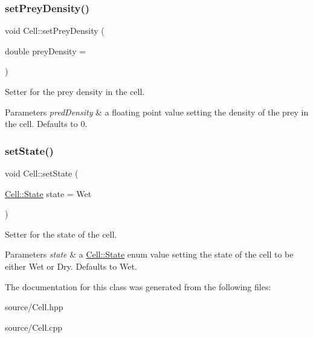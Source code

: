 \subsubsection{\texorpdfstring{set\+Prey\+Density()}{setPreyDensity()}}
{\footnotesize\ttfamily void Cell\+::set\+Prey\+Density (\begin{DoxyParamCaption}\item[{double}]{prey\+Density = {} }\end{DoxyParamCaption})}



Setter for the prey density in the cell. 


\begin{DoxyParams}{Parameters}
{\em pred\+Density} & a floating point value setting the density of the prey in the cell. Defaults to 0. \\
\hline
\end{DoxyParams}
\mbox{\label{class_cell_ac388ff95a4d94da1497847ead859f258}} 
\subsubsection{\texorpdfstring{set\+State()}{setState()}}
{\footnotesize\ttfamily void Cell\+::set\+State (\begin{DoxyParamCaption}\item[{\hyperlink{class_cell_a21d74a2efcb79c93e5649b06a50b7cf5}{Cell\+::\+State}}]{state = {\ttfamily Wet} }\end{DoxyParamCaption})}



Setter for the state of the cell. 


\begin{DoxyParams}{Parameters}
{\em state} & a \hyperlink{class_cell_a21d74a2efcb79c93e5649b06a50b7cf5}{Cell\+::\+State} enum value setting the state of the cell to be either Wet or Dry. Defaults to Wet. \\
\hline
\end{DoxyParams}


The documentation for this class was generated from the following files\+:\begin{DoxyCompactItemize}
\item 
source/Cell.\+hpp\item 
source/Cell.\+cpp\end{DoxyCompactItemize}
